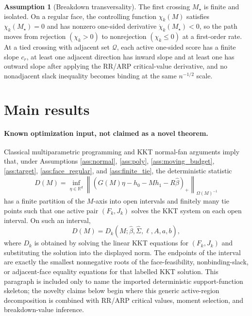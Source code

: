 \documentclass[11pt]{article}
\theoremstyle{definition}
\newtheorem{assumption}{Assumption}
\theoremstyle{plain}
\theoremstyle{remark}
\begin{document}
\begin{assumption}[Breakdown transversality]\label{ass:transversal}
The first crossing \(M_\star\) is finite and isolated.  On a regular face,
the controlling function \(\chi_k(M)\) satisfies
\(\chi_k(M_\star)=0\) and has nonzero one-sided derivative
\(\dot\chi_k(M_\star)<0\), so the path moves from rejection
\((\chi_k>0)\) to nonrejection \((\chi_k\le 0)\) at a first-order rate.  At a
tied crossing with adjacent set \(\mathcal{Q}\), each active one-sided score
has a finite slope \(c_r\), at least one adjacent direction has inward slope
and at least one has outward slope after applying the RR/ARP critical-value
derivative, and no nonadjacent slack inequality becomes binding at the same
\(n^{-1/2}\) scale.
\end{assumption}

\section{Main results}
\paragraph{Known optimization input, not claimed as a novel theorem.}
Classical multiparametric programming and KKT normal-fan arguments imply that,
under Assumptions \ref{ass:normal}, \ref{ass:poly},
\ref{ass:moving_budget}, \ref{ass:target}, \ref{ass:face_regular}, and
\ref{ass:finite_tie}, the deterministic statistic
\[
D(M)=\inf_{\eta\in\mathbb{R}^d}
\left\| \left(G(M)\eta-h_0-Mh_1-R\widehat\beta\right)_{+}
\right\|_{\Omega(M)^{-1}}
\]
has a finite partition of the \(M\)-axis into open intervals and finitely many
tie points such that one active pair \((F_k,J_k)\) solves the KKT system on
each open interval.  On such an interval,
\[
D(M)=D_k(M;\widehat\beta,\widehat\Sigma,\ell,A,a,b),
\]
where \(D_k\) is obtained by solving the linear KKT equations for
\((F_k,J_k)\) and substituting the solution into the displayed norm.  The
endpoints of the interval are exactly the smallest nonnegative roots of the
face-feasibility, nonbinding-slack, or adjacent-face equality equations for
that labelled KKT solution.  This paragraph is included only to name the
imported deterministic support-function skeleton; the novelty claims below
begin where this generic active-region decomposition is combined with RR/ARP
critical values, moment selection, and breakdown-value inference.
\end{document}
